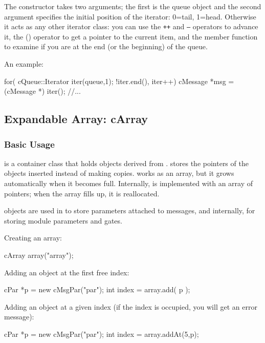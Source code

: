 The  constructor takes two arguments; the first
is the queue object and the second argument specifies the initial position
of the iterator: 0=tail, 1=head. Otherwise it acts as any other
{\opp} iterator class: you can use the \texttt{++} and \texttt{--} operators to advance
it, the () operator to get a pointer to the current item, and the
 member function to examine if you are at the end (or the
beginning) of the queue.


An example:

\begin{cpp}
for( cQueue::Iterator iter(queue,1); !iter.end(), iter++)
{
  cMessage *msg = (cMessage *) iter();
  //...
}
\end{cpp}




\subsection{Expandable Array: cArray}

\subsubsection{Basic Usage}


 is a container class that holds objects derived from
.  stores the pointers of the objects
inserted instead of making copies.  works as an array,
but it grows automatically when it becomes full. Internally,
 is implemented with an array of pointers; when the array
fills up, it is reallocated.

 objects are used in {\opp} to store parameters
attached to messages, and internally, for storing module parameters
and gates.


Creating an array:

\begin{cpp}
cArray array("array");
\end{cpp}

Adding an object at the first free index:

\begin{cpp}
cPar *p = new cMsgPar("par");
int index = array.add( p );
\end{cpp}


Adding an object at a given index (if the index is occupied,
you will get an error message):

\begin{cpp}
cPar *p = new cMsgPar("par");
int index = array.addAt(5,p);
\end{cpp}


